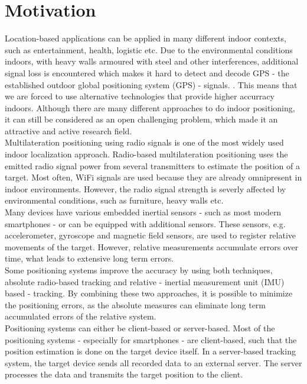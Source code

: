 \section{Motivation}
Location-based applications can be applied in many different indoor contexts, such as entertainment, health, logistic etc. Due to the environmental conditions indoors, with heavy walls armoured with steel and other interferences, additional signal loss is encountered which makes it hard to detect and decode GPS - the established outdoor global positioning system (GPS) - signals. \cite{GPSforIndoor}. This means that we are forced to use alternative technologies that provide higher accurracy indoors. Although there are many different approaches to do indoor positioning, it can still be considered as an open challenging problem, which made it an attractive and active research field.\\
\noindent\hspace*{5mm}%
Multilateration positioning using radio signals is one of the most widely used indoor localization approach. Radio-based multilateration positioning uses the emitted radio signal power from several transmitters to estimate the position of a target. Most often, WiFi signals are used because they are already omnipresent in indoor environments. However, the radio signal strength is severly affected by environmental conditions, such as furniture, heavy walls etc.\\
\noindent\hspace*{5mm}%
Many devices have various embedded inertial sensors - such as most modern smartphones - or can be equipped with additional sensors. These sensors, e.g. accelerometer, gyroscope and magnetic field sensors, are used to register relative movements of the target. However, relative measurements accumulate errors over time, what leads to extensive long term errors.\\
\noindent\hspace*{5mm}%
Some positioning systems improve the accuracy by using both techniques, absolute radio-based tracking and relative - inertial measurement unit (IMU) based - tracking. By combining these two approaches, it is possible to minimize the positioning errors, as the absolute measures can eliminate long term accumulated errors of the relative system. \\
\noindent\hspace*{5mm}%
Positioning systems can either be client-based or server-based. Most of the positioning systems - especially for smartphones - are client-based, such that the position estimation is done on the target device itself. In a server-based tracking system, the target device sends all recorded data to an external server. The server processes the data and transmits the target position to the client. \\
